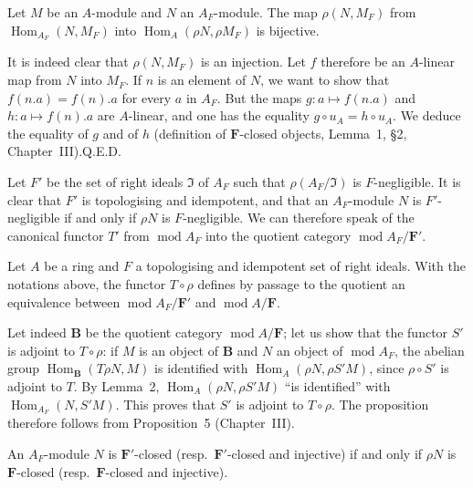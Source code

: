 \begin{lemma}
Let $M$ be an $A$-module and $N$ an $A_F$-module. The map
$\rho(N,M_F)$ from $\operatorname{Hom}_{A_F}(N,M_F)$ into
$\operatorname{Hom}_A(\rho N,\rho M_F)$ is bijective.
\end{lemma}

It is indeed clear that $\rho(N,M_F)$ is an injection. Let $f$ therefore
be an $A$-linear map from $N$ into $M_F$. If $n$ is an element of $N$,
we want to show that $f(n.a)=f(n).a$ for every $a$ in $A_F$. But the
maps $g:a\mapsto f(n.a)$ and $h:a\mapsto f(n).a$ are $A$-linear, and one
has the equality $g\circ u_A=h\circ u_A$. We deduce the equality of $g$
and of $h$ (definition of $\mathbf{F}$-closed objects, Lemma~1, \S2,
Chapter~III).\hfill Q.E.D.

Let $F'$ be the set of right ideals $\mathfrak{I}$ of $A_F$ such that
$\rho(A_F/\mathfrak{I})$ is $F$-negligible. It is clear that $F'$ is
topologising and idempotent, and that an $A_F$-module $N$ is
$F'$-negligible if and only if $\rho N$ is $F$-negligible. We can
therefore speak of the canonical functor $T'$ from
$\operatorname{mod} A_F$ into the quotient category
$\operatorname{mod} A_F/\mathbf{F}'$.

\begin{proposition}
Let $A$ be a ring and $F$ a topologising and idempotent set of right
ideals. With the notations above, the functor $T\circ\rho$ defines by
passage to the quotient an equivalence between
$\operatorname{mod} A_F/\mathbf{F}'$ and
$\operatorname{mod} A/\mathbf{F}$.
\end{proposition}

Let indeed $\mathbf{B}$ be the quotient category
$\operatorname{mod} A/\mathbf{F}$; let us show that the functor $S'$ is
adjoint to $T\circ\rho$: if $M$ is an object of $\mathbf{B}$ and $N$ an
object of $\operatorname{mod} A_F$, the abelian group
$\operatorname{Hom}_{\mathbf{B}}(T\rho N,M)$ is identified with
$\operatorname{Hom}_A(\rho N,\rho S'M)$, since $\rho\circ S'$ is adjoint
to $T$. By Lemma~2, $\operatorname{Hom}_A(\rho N,\rho S'M)$ ``is
identified'' with $\operatorname{Hom}_{A_F}(N,S'M)$. This proves that
$S'$ is adjoint to $T\circ\rho$. The proposition therefore follows from
Proposition~5 (Chapter~III).

\begin{unnumberedcorollary}
An $A_F$-module $N$ is $\mathbf{F}'$-closed (resp.\ $\mathbf{F}'$-closed
and injective) if and only if $\rho N$ is $\mathbf{F}$-closed (resp.\
$\mathbf{F}$-closed and injective).
\end{unnumberedcorollary}

